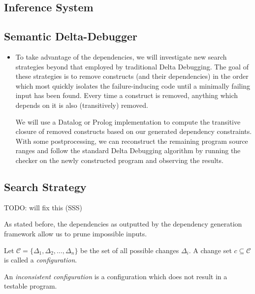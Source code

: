 \documentclass[preprint]{acm_proc_article-sp}
\newenvironment{definition}[1][Definition]{\begin{trivlist}
\item[\hskip \labelsep {\bfseries #1}]}{\end{trivlist}}
\begin{document}
\subsection{Inference System}

\subsection{Semantic Delta-Debugger}

\begin{itemize}

\item To take advantage of the dependencies, we will investigate new search
  strategies beyond that employed by traditional Delta Debugging.  The goal of
  these strategies is to remove constructs (and their dependencies) in the order
  which most quickly isolates the failure-inducing code until a minimally
  failing input has been found.  Every time a construct is removed, anything
  which depends on it is also (transitively) removed.

  We will use a Datalog or Prolog implementation to compute the transitive
  closure of removed constructs based on our generated dependency constraints.
  With some postprocessing, we can reconstruct the remaining program source
  ranges and follow the standard Delta Debugging algorithm by running the
  checker on the newly constructed program and observing the results.

\end{itemize}

\subsection{Search Strategy}
TODO: will fix this (SSS)

As stated before, the dependencies as outputted by the dependency generation
framework allow us to prune impossible inputs. 

\begin{definition}
Let $\mathcal{C} = \{ \Delta_1, \Delta_2, \ldots, \Delta_n \}$ be the set of all
possible changes $\Delta_i$. A change set $c \subseteq \mathcal{C}$ is called a
\emph{configuration}.
\end{definition}

\begin{definition}
An \emph{inconsistent configuration} is a configuration which does not result in
a testable program.
\end{definition}
\end{document}
